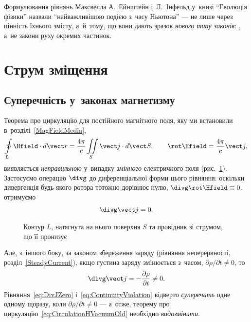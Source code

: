 Формулювання рівнянь Максвелла А.~Ейнштейн і~Л.~Інфельд у~книзі \enquote{Еволюція фізики}
назвали \enquote{найважливішою подією з~часу Ньютона} --- не лише через цінність їхнього
змісту, а~й~тому, що вони дають зразок \emph{нового типу законів}: , а~не закони руху окремих частинок.


\section{Струм зміщення}\hypertarget{displacement-current}{}


\subsection*{Суперечність у~законах магнетизму}


Теорема про циркуляцію для постійного магнітного поля, яку ми встановили
в~розділі~\ref{MagFieldMedia},
\begin{equation}\label{eq:CirculationHVacuumOld}
	\oint\limits_L \Hfield\cdot d\vect r = \frac{4\pi}{c}\iint\limits_S \vect j\cdot d\vect S, \qquad \rot\Hfield = \frac{4\pi}{c}\vect j,
\end{equation}
виявляється \emph{неправильною} у~випадку \emph{змінного} електричного поля
(рис.~\ref{pic:CircThm}). Застосуємо операцію $\divg$ до диференціальної форми цього
рівняння: оскільки дивергенція будь-якого ротора тотожно дорівнює нулю, $\divg\rot\Hfield
\equiv 0$, отримуємо
\begin{equation}\label{eq:DivJZero}
	\divg\vect j = 0.
\end{equation}

\begin{figure}\centering
	\caption{Контур $L$, натягнута на нього поверхня $S$ та провідник зі струмом, що її
	пронизує\label{pic:CircThm}}
\end{figure}

Але, з~іншого боку, за законом збереження заряду (рівняння неперервності,
розділ~\ref{SteadyCurrent}), якщо густина заряду змінюється з~часом, $\partial\rho/\partial t
\neq 0$, то
\begin{equation}\label{eq:ContinuityViolation}
	\divg\vect j = -\frac{\partial\rho}{\partial t} \neq 0.
\end{equation}
Рівняння~\eqref{eq:DivJZero} і~\eqref{eq:ContinuityViolation} відверто \emph{суперечать}
одне одному щоразу, коли $\partial\rho/\partial t\neq0$ --- а~отже, теорему про
циркуляцію~\eqref{eq:CirculationHVacuumOld} необхідно \emph{видозмінити}.

